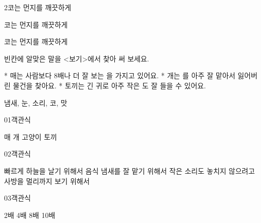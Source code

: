 \documentclass[fs13,seriesSau]{korfarm-base}
\begin{document}
\begin{kfSentenceUnit}{2}{코는 먼지를 깨끗하게}
\begin{kfChoices}
\kfChoice 코는
\kfChoice 먼지를
\kfChoice 깨끗하게
\end{kfChoices}
\begin{kfChoices}
\kfChoice 코는
\kfChoice 먼지를
\kfChoice 깨끗하게
\end{kfChoices}
\end{kfSentenceUnit}

\kfActivityBg \par{}\par\nopagebreak[4]\smallskip\nopagebreak[4]
\begin{kfBlankList}
\kfBlankItem 빈칸에 알맞은 말을 <보기>에서 찾아 써 보세요.

* 매는 사람보다 8배나 더 잘 보는 \kfFillBlank[42mm]{}을 가지고 있어요. * 개는 \kfFillBlank[42mm]{}를 아주 잘 맡아서 잃어버린 물건을 찾아요. * 토끼는 긴 귀로 아주 작은 \kfFillBlank[42mm]{}도 잘 들을 수 있어요.
\begin{kfEvidence}냄새, 눈, 소리, 코, 맛\end{kfEvidence}
\end{kfBlankList}

\kfActivityBg \par{}\par\nopagebreak[4]\smallskip\nopagebreak[4]


\begin{kfQBlock}{01}{객관식}
\begin{kfChoices}
\kfChoice 매
\kfChoice 개
\kfChoice 고양이
\kfChoice 토끼
\end{kfChoices}
\end{kfQBlock}
\begin{kfQBlock}{02}{객관식}
\begin{kfChoices}
\kfChoice 빠르게 하늘을 날기 위해서
\kfChoice 음식 냄새를 잘 맡기 위해서
\kfChoice 작은 소리도 놓치지 않으려고
\kfChoice 사방을 멀리까지 보기 위해서
\end{kfChoices}
\end{kfQBlock}
\begin{kfQBlock}{03}{객관식}
\begin{kfChoices}
\kfChoice 2배
\kfChoice 4배
\kfChoice 8배
\kfChoice 10배
\end{kfChoices}
\end{kfQBlock}
\end{document}
